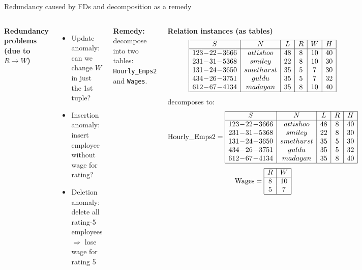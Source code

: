 \documentclass[10pt,aspectratio=169]{beamer}
\newcommand{\tinytable}[1]{\scriptsize #1 \normalsize}
\begin{document}
\begin{frame}{Redundancy caused by FDs and decomposition as a remedy}
\begin{columns}[T,onlytextwidth]
\textbf{Redundancy problems (due to \(R \rightarrow W\))}
\begin{itemize}
  \item Update anomaly: can we change \(W\) in just the 1st tuple?
  \item Insertion anomaly: insert employee without wage for rating?
  \item Deletion anomaly: delete all rating-5 employees \(\Rightarrow\) lose wage for rating 5
\end{itemize}
\textbf{Remedy:} decompose into two tables: \texttt{Hourly\_Emps2} and \texttt{Wages}.

\textbf{Relation instances (as tables)}\\[-0.2em]
\tinytable{
\[
\begin{array}{|c|c|c|c|c|c|}\hline
S & N & L & R & W & H\\\hline
123\!-\!22\!-\!3666 & attishoo & 48 & 8 & 10 & 40\\
231\!-\!31\!-\!5368 & smiley  & 22 & 8 & 10 & 30\\
131\!-\!24\!-\!3650 & smethurst & 35 & 5 & 7 & 30\\
434\!-\!26\!-\!3751 & guldu   & 35 & 5 & 7 & 32\\
612\!-\!67\!-\!4134 & madayan & 35 & 8 & 10 & 40\\\hline
\end{array}
\]
decomposes to:\\ 
\vspace{-0.4em}
\[
\mbox{Hourly\_Emps2} =
\begin{array}{|c|c|c|c|c|}\hline
S & N & L & R & H\\\hline
123\!-\!22\!-\!3666 & attishoo & 48 & 8 & 40\\
231\!-\!31\!-\!5368 & smiley  & 22 & 8 & 30\\
131\!-\!24\!-\!3650 & smethurst & 35 & 5 & 30\\
434\!-\!26\!-\!3751 & guldu   & 35 & 5 & 32\\
612\!-\!67\!-\!4134 & madayan & 35 & 8 & 40\\\hline
\end{array}
\]
\[
\mbox{Wages} =
\begin{array}{|c|c|}\hline
R & W\\\hline
8 & 10\\
5 & 7\\\hline
\end{array}
\]
}
\end{columns}
\end{frame}
\end{document}
